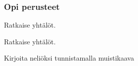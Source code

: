 \begin{tehtavasivu}

\subsubsection*{Opi perusteet}

\begin{tehtava}
    Ratkaise yhtälöt.
    \begin{alakohdat}

    \end{alakohdat}
    \begin{vastaus}
        \begin{alakohdat}
        \end{alakohdat}
    \end{vastaus}
\end{tehtava}

\begin{tehtava}
    Ratkaise yhtälöt.
    \begin{alakohdat}
    \end{alakohdat}
    \begin{vastaus}
        \begin{alakohdat}
        \end{alakohdat}
    \end{vastaus}
\end{tehtava}

\begin{tehtava}
    Kirjoita neliöksi tunnistamalla muistikaava
    \begin{alakohdat}
    \end{alakohdat}
    \begin{vastaus}
        \begin{alakohdat}
        \end{alakohdat}
    \end{vastaus}
\end{tehtava}


\end{tehtavasivu}
